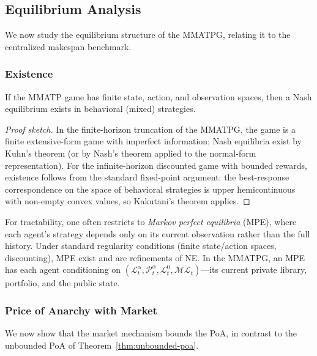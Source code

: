 \subsection{Equilibrium Analysis}\label{sec:equilibria}

We now study the equilibrium structure of the MMATPG, relating it to the centralized makespan benchmark.

\subsubsection{Existence}

\begin{proposition}\label{prop:ne-existence}
If the MMATP game has finite state, action, and observation spaces, then a Nash equilibrium exists in behavioral (mixed) strategies.
\end{proposition}

\begin{proof}[Proof sketch]
In the finite-horizon truncation of the MMATPG, the game is a finite extensive-form game with imperfect information; Nash equilibria exist by Kuhn's theorem (or by Nash's theorem applied to the normal-form representation). For the infinite-horizon discounted game with bounded rewards, existence follows from the standard fixed-point argument: the best-response correspondence on the space of behavioral strategies is upper hemicontinuous with non-empty convex values, so Kakutani's theorem applies.
\end{proof}

\begin{remark}
For tractability, one often restricts to \emph{Markov perfect equilibria} (MPE), where each agent's strategy depends only on its current observation rather than the full history. Under standard regularity conditions (finite state/action spaces, discounting), MPE exist and are refinements of NE. In the MMATPG, an MPE has each agent conditioning on $(\mathcal{L}^\alpha_t, \mathcal{P}^\alpha_t, \mathcal{L}^0_t, \mathcal{ML}_t)$---its current private library, portfolio, and the public state.
\end{remark}


\subsubsection{Price of Anarchy with Market}\label{sec:poa-market}

We now show that the market mechanism bounds the PoA, in contrast to the unbounded PoA of Theorem~\ref{thm:unbounded-poa}.

